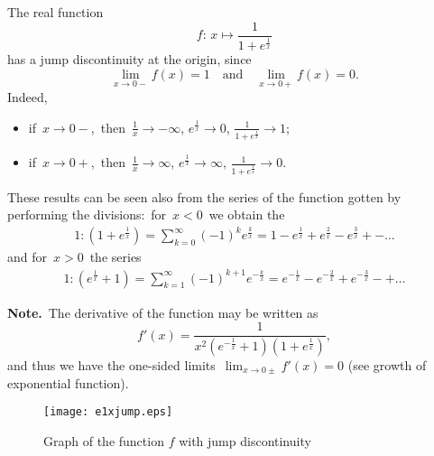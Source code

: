 \documentclass[12pt]{article}
\theoremstyle{definition}
\begin{document}
The  real function
$$f\colon\,x \mapsto \frac{1}{1+e^\frac{1}{x}}$$
has a jump discontinuity at the origin, since
$$\lim_{x\to 0-}f(x) = 1\quad \mathrm{and}\quad \lim_{x\to 0+}f(x) =0.$$
Indeed, 
\begin{itemize}
\item if\, $x \to 0-$,\, then\, $\displaystyle \frac{1}{x} \to -\infty$,\; 
$\displaystyle e^\frac{1}{x} \to 0$,\; 
$\displaystyle \frac{1}{1+e^\frac{1}{x}} \to 1$; 
\item if\, $x \to 0+$,\, then\, $\displaystyle \frac{1}{x} \to \infty$,\; 
$\displaystyle e^\frac{1}{x} \to \infty$,\; 
$\displaystyle \frac{1}{1+e^\frac{1}{x}} \to 0$.
\end{itemize}
These results can be seen also from the series  of the function gotten by performing the divisions:\, for\, $x < 0$\, we obtain the  
\begin{align*}
1:(1+e^{\frac{1}{x}}) = \sum_{k=0}^\infty(-1)^ke^{\frac{k}{x}}
= 1-e^{\frac{1}{x}}+e^{\frac{2}{x}}-e^{\frac{3}{x}}+-\ldots
\end{align*}
and for\, $x > 0$\, the series
\begin{align*}
1:(e^{\frac{1}{x}}+1) = \sum_{k=1}^\infty(-1)^{k+1}e^{-\frac{k}{x}}
= e^{-\frac{1}{x}}-e^{-\frac{2}{x}}+e^{-\frac{3}{x}}-+\ldots
\end{align*}

\textbf{Note.}\, The derivative of the function may be written as 
$$f'(x) = \frac{1}{x^2(e^{-\frac{1}{x}}+1)(1+e^\frac{1}{x})},$$ 
and thus we have the one-sided limits\, $\displaystyle \lim_{x\to 0\pm}f'(x) = 0$ (see growth of exponential function).

\begin{figure}[!tb]
\begin{center}
\texttt{[image: e1xjump.eps]}
\end{center}
\caption{Graph of the function $f$ with jump discontinuity}
\end{figure}

\end{document}
